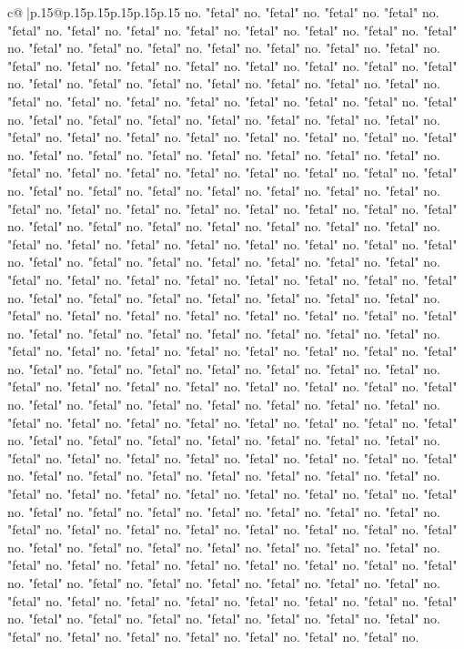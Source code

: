 \documentclass{article}
\begin{document}
{\begin{supertabular}{c@{$\;$}|p{.15\linewidth}@{}p{.15\linewidth}p{.15\linewidth}p{.15\linewidth}p{.15\linewidth}p{.15\linewidth}}
{{{no. "fetal" no. "fetal" no. "fetal" no. "fetal" no. "fetal" no. "fetal" no. "fetal" no. "fetal" no. "fetal" no. "fetal" no. "fetal" no. "fetal" no. "fetal" no. "fetal" no. "fetal" no. "fetal" no. "fetal" no. "fetal" no. "fetal" no. "fetal" no. "fetal" no. "fetal" no. "fetal" no. "fetal" no. "fetal" no. "fetal" no. "fetal" no. "fetal" no. "fetal" no. "fetal" no. "fetal" no. "fetal" no. "fetal" no. "fetal" no. "fetal" no. "fetal" no. "fetal" no. "fetal" no. "fetal" no. "fetal" no. "fetal" no. "fetal" no. "fetal" no. "fetal" no. "fetal" no. "fetal" no. "fetal" no. "fetal" no. "fetal" no. "fetal" no. "fetal" no. "fetal" no. "fetal" no. "fetal" no. "fetal" no. "fetal" no. "fetal" no. "fetal" no. "fetal" no. "fetal" no. "fetal" no. "fetal" no. "fetal" no. "fetal" no. "fetal" no. "fetal" no. "fetal" no. "fetal" no. "fetal" no. "fetal" no. "fetal" no. "fetal" no. "fetal" no. "fetal" no. "fetal" no. "fetal" no. "fetal" no. "fetal" no. "fetal" no. "fetal" no. "fetal" no. "fetal" no. "fetal" no. "fetal" no. "fetal" no. "fetal" no. "fetal" no. "fetal" no. "fetal" no. "fetal" no. "fetal" no. "fetal" no. "fetal" no. "fetal" no. "fetal" no. "fetal" no. "fetal" no. "fetal" no. "fetal" no. "fetal" no. "fetal" no. "fetal" no. "fetal" no. "fetal" no. "fetal" no. "fetal" no. "fetal" no. "fetal" no. "fetal" no. "fetal" no. "fetal" no. "fetal" no. "fetal" no. "fetal" no. "fetal" no. "fetal" no. "fetal" no. "fetal" no. "fetal" no. "fetal" no. "fetal" no. "fetal" no. "fetal" no. "fetal" no. "fetal" no. "fetal" no. "fetal" no. "fetal" no. "fetal" no. "fetal" no. "fetal" no. "fetal" no. "fetal" no. "fetal" no. "fetal" no. "fetal" no. "fetal" no. "fetal" no. "fetal" no. "fetal" no. "fetal" no. "fetal" no. "fetal" no. "fetal" no. "fetal" no. "fetal" no. "fetal" no. "fetal" no. "fetal" no. "fetal" no. "fetal" no. "fetal" no. "fetal" no. "fetal" no. "fetal" no. "fetal" no. "fetal" no. "fetal" no. "fetal" no. "fetal" no. "fetal" no. "fetal" no. "fetal" no. "fetal" no. "fetal" no. "fetal" no. "fetal" no. "fetal" no. "fetal" no. "fetal" no. "fetal" no. "fetal" no. "fetal" no. "fetal" no. "fetal" no. "fetal" no. "fetal" no. "fetal" no. "fetal" no. "fetal" no. "fetal" no. "fetal" no. "fetal" no. "fetal" no. "fetal" no. "fetal" no. "fetal" no. "fetal" no. "fetal" no. "fetal" no. "fetal" no. "fetal" no. "fetal" no. "fetal" no. "fetal" no. "fetal" no. "fetal" no. "fetal" no. "fetal" no. "fetal" no. "fetal" no. "fetal" no. "fetal" no. "fetal" no. "fetal" no. "fetal" no. "fetal" no. "fetal" no. "fetal" no. "fetal" no. "fetal" no. "fetal" no. "fetal" no. "fetal" no. "fetal" no. "fetal" no. "fetal" no. "fetal" no. "fetal" no. "fetal" no. "fetal" no. "fetal" no. "fetal" no. "fetal" no. "fetal" no. "fetal" no. "fetal" no. "fetal" no. "fetal" no. "fetal" no. "fetal" no. "fetal" no. "fetal" no. "fetal" no. "fetal" no. "fetal" no. "fetal" no. "fetal" no. "fetal" no. "fetal" no. "fetal" no. "fetal" no. "fetal" no. "fetal" no. "fetal" no. "fetal" no. "fetal" no. "fetal" no. "fetal" no. "fetal" no. "fetal" no. "fetal" no. "fetal" no. "fetal" no. "fetal" no. "fetal" no. "fetal" no. "fetal" no. "fetal" no. "fetal" no. "fetal" no. "fetal" no. "fetal" no. "fetal" no. "fetal" no. "fetal" no. }}}
\end{supertabular}}
\end{document}
